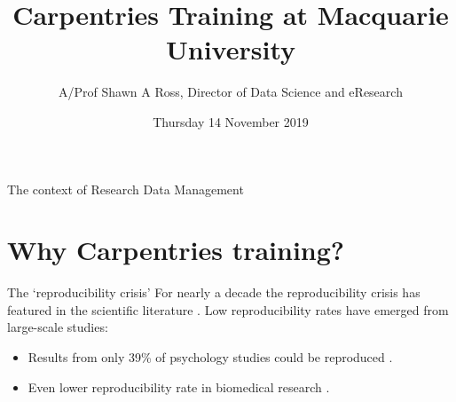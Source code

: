 \documentclass[aspectratio=169, 11pt]{beamer} %
\title{Carpentries Training at Macquarie University} %
\author{A/Prof Shawn A Ross, Director of Data Science and eResearch}               %
\institute{Office of the Deputy Vice-Chancellor (Research)}         %
\date{Thursday 14 November 2019} %
\begin{document}

\maketitle

  

\begin{frame}{The context of Research Data Management}
  \tableofcontents
\end{frame}

%



\section{Why Carpentries training?}

\begin{frame}{The `reproducibility crisis'}
  For nearly a decade the reproducibility crisis has featured in the scientific literature \cite{Jasny2011-bw, Baker2016-cf, Munafo2017-bj}. Low reproducibility rates have emerged from large-scale studies:
    \begin{itemize}[label=\textbullet]
        \item Results from only 39\% of psychology studies could be reproduced \cite{Open_Science_Collaboration2015-vf}.
        \item Even lower reproducibility rate in biomedical research \cite{Begley2012-xt,Prinz2011-za}.
    \end{itemize}
\end{frame}
\end{document}

